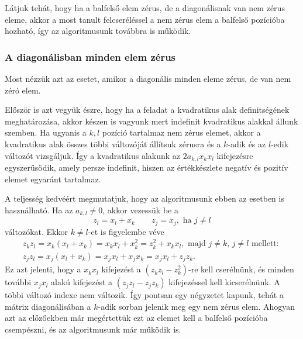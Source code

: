 \documentclass[9pt, a4paper, showtrims]{memoir}
\theoremstyle{plain}
\theoremstyle{remark}
\theoremstyle{definition}
\begin{document}
Látjuk tehát, hogy ha a balfelső elem zérus, de a diagonálisnak van nem zérus eleme, 
akkor a most tanult felcseréléssel a nem zérus elem a balfelső pozícióba hozható, így az algoritmusunk továbbra is működik.

\subsubsection{A diagonálisban minden elem zérus}
Most nézzük azt az esetet, amikor a diagonális minden eleme zérus, de van nem zéró elem.

Először is azt vegyük észre, hogy ha a feladat a kvadratikus alak definitségének meghatározása, 
akkor készen is vagyunk mert indefinit kvadratikus alakkal állunk szemben.
Ha ugyanis a $k,l$ pozíció tartalmaz nem zérus elemet, 
akkor a kvadratikus alak összes többi változóját állítsuk zérusra és a $k$-adik és az $l$-edik változót vizsgáljuk.
Így a kvadratikus alakunk az $2a_{k,l}x_kx_l$ kifejezésre egyszerűsödik, 
amely persze indefinit, hiszen az értékkészlete negatív és pozitív elemet egyaránt tartalmaz.

A teljesség kedvéért megmutatjuk, 
hogy az algoritmusunk ebben az esetben is használható.
Ha az $a_{k,l}\neq 0$, akkor vezessük be a 
\[
    z_l=x_l+x_k\qquad z_j=x_j, \text{ ha }j\neq l
\]
változókat.
Ekkor $k\neq l$-et is figyelembe véve
\begin{multline*}
z_kz_l=x_k\left( x_l+x_k \right)=x_kx_l+x_k^2=z_k^2+x_kx_l,
\text{ majd $j\neq k$, $j\neq l$ mellett: }\\
z_jz_l=x_j\left( x_l+x_k \right)=x_jx_l+x_jx_k=x_jx_l+z_jz_k.
\end{multline*}
Ez azt jelenti, hogy a $x_kx_l$ kifejezést a $(z_kz_l-z_k^2)$-re kell cserélnünk,
és minden további $x_jx_l$ alakú kifejezést a $(z_jz_l-z_jz_k)$ kifejezéssel kell kicserélnünk.
A többi változó indexe nem változik.
Így pontsan egy négyzetet kapunk, 
tehát a mátrix diagonálisában a $k$-adik sorban jelenik meg egy nem zérus elem.
Ahogyan azt az előzőekben már megértettük ezt az elemet kell a balfelső pozícióba csempészni, 
és az algoritmusunk már működik is.
\end{document}

